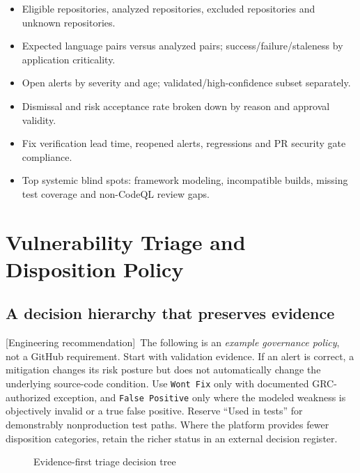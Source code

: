 \documentclass[11pt,letterpaper,oneside]{book}
\newcommand{\srcR}{\textsf{[Engineering recommendation]}}
\begin{document}
\begin{itemize}
\item Eligible repositories, analyzed repositories, excluded repositories and unknown repositories.
\item Expected language pairs versus analyzed pairs; success/failure/staleness by application criticality.
\item Open alerts by severity and age; validated/high-confidence subset separately.
\item Dismissal and risk acceptance rate broken down by reason and approval validity.
\item Fix verification lead time, reopened alerts, regressions and PR security gate compliance.
\item Top systemic blind spots: framework modeling, incompatible builds, missing test coverage and non-CodeQL review gaps.
\end{itemize}

\chapter{Vulnerability Triage and Disposition Policy}

\section{A decision hierarchy that preserves evidence}

\srcR\ The following is an \emph{example governance policy}, not a GitHub requirement. Start with validation evidence. If an alert is correct, a mitigation changes its risk posture but does not automatically change the underlying source-code condition. Use \texttt{Won\textquotesingle t Fix} only with documented GRC-authorized exception, and \texttt{False Positive} only where the modeled weakness is objectively invalid or a true false positive. Reserve ``Used in tests'' for demonstrably nonproduction test paths. Where the platform provides fewer disposition categories, retain the richer status in an external decision register.

\begin{figure}[htbp]\centering
{}\caption{Evidence-first triage decision tree}\end{figure}
\end{document}
